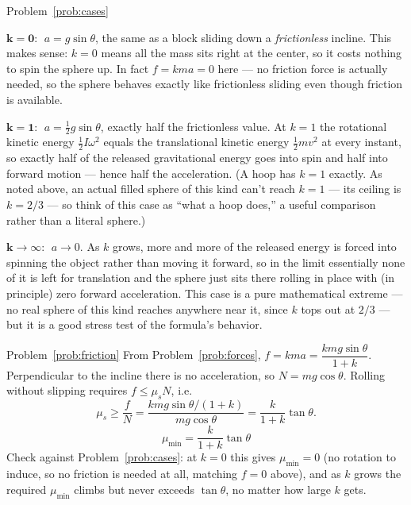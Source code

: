 \documentclass[11pt]{article}
\begin{document}
\begin{pssolution}{Problem~\ref{prob:cases}}{}
\begin{subpart}
\item $\boldsymbol{k=0}$: $\;a = g\sin\theta$, the same as a block sliding down a
\emph{frictionless} incline. This makes sense: $k=0$ means all the mass sits right at
the center, so it costs nothing to spin the sphere up. In fact $f = kma = 0$ here --- no
friction force is actually needed, so the sphere behaves exactly like frictionless
sliding even though friction is available.

\item $\boldsymbol{k=1}$: $\;a = \tfrac12 g\sin\theta$, exactly half the frictionless
value. At $k=1$ the rotational kinetic energy $\tfrac12 I\omega^2$ equals the
translational kinetic energy $\tfrac12 mv^2$ at every instant, so exactly half of the
released gravitational energy goes into spin and half into forward motion --- hence half
the acceleration. (A hoop has $k=1$ exactly. As noted above, an actual filled sphere of
this kind can't reach $k=1$ --- its ceiling is $k=2/3$ --- so think of this case as
``what a hoop does,'' a useful comparison rather than a literal sphere.)

\item $\boldsymbol{k\to\infty}$: $\;a \to 0$. As $k$ grows, more and more of the released
energy is forced into spinning the object rather than moving it forward, so in the limit
essentially none of it is left for translation and the sphere just sits there rolling in
place with (in principle) zero forward acceleration. This case is a pure mathematical
extreme --- no real sphere of this kind reaches anywhere near it, since $k$ tops out at
$2/3$ --- but it is a good stress test of the formula's behavior.
\end{subpart}
\end{pssolution}

\begin{pssolution}{Problem~\ref{prob:friction}}{}
From Problem~\ref{prob:forces}, $f = kma = \dfrac{kmg\sin\theta}{1+k}$. Perpendicular to
the incline there is no acceleration, so $N = mg\cos\theta$. Rolling without slipping
requires $f \le \mu_s N$, i.e.
\[
\mu_s \ge \frac{f}{N} = \frac{kmg\sin\theta/(1+k)}{mg\cos\theta} = \frac{k}{1+k}\tan\theta.
\]
\[
\boxed{\mu_{\min} = \frac{k}{1+k}\tan\theta}
\]
Check against Problem~\ref{prob:cases}: at $k=0$ this gives $\mu_{\min}=0$ (no rotation
to induce, so no friction is needed at all, matching $f=0$ above), and as $k$ grows the
required $\mu_{\min}$ climbs but never exceeds $\tan\theta$, no matter how large $k$
gets.
\end{pssolution}
\end{document}
